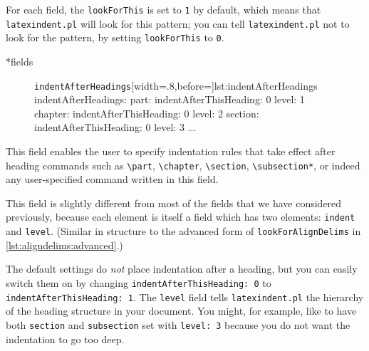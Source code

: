 \documentclass[10pt]{article}
\begin{document}
For each field, the \texttt{lookForThis} is set to \texttt{1} by default, which means that \texttt{latexindent.pl}
will look for this pattern; you can tell \texttt{latexindent.pl} not to look for the pattern, by setting 
\texttt{lookForThis} to \texttt{0}. 

*{fields} 
\begin{figure}
\begin{yaml}{\texttt{indentAfterHeadings}}[width=.8\linewidth,before=\centering]{lst:indentAfterHeadings}
indentAfterHeadings:
    part:
       indentAfterThisHeading: 0
       level: 1
    chapter:
       indentAfterThisHeading: 0
       level: 2
    section:
       indentAfterThisHeading: 0
       level: 3
    ...
	\end{yaml}
\end{figure}
This field enables the user to specify
indentation rules that take effect after heading commands such as \lstinline!\part!, \lstinline!\chapter!,
\lstinline!\section!, \lstinline!\subsection*!, or indeed any user-specified command written in this field. 

This field is slightly different from most
of the fields that we have considered previously, because each element is
itself a field which has two elements: \texttt{indent} and \texttt{level}. (Similar
in structure to the advanced form of  \texttt{lookForAlignDelims} in \cref{lst:aligndelims:advanced}.)

The default settings do \emph{not} place indentation after a heading, but you
can easily switch them on by changing \texttt{indentAfterThisHeading: 0} to \texttt{indentAfterThisHeading: 1}.
The \texttt{level} field tells \texttt{latexindent.pl} the hierarchy of the heading
structure in your document. You might, for example, like to have both \texttt{section}
and \texttt{subsection} set with \texttt{level: 3} because you do not want the indentation to go too deep.
\end{document}
